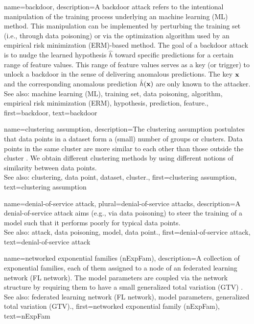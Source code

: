 {	
{name={backdoor}, 
	description={A backdoor attack refers 
		to the intentional manipulation of the training process underlying an machine learning (ML) method. This manipulation 
		can be implemented by perturbing the training set (i.e., through data poisoning) or via the 
		optimization algorithm used by an empirical risk minimization (ERM)-based method. The goal of a 
		backdoor attack is to nudge the learned hypothesis $\hat{h}$ 
		toward specific predictions for a certain range of feature values. This range of feature 
		values serves as a key (or trigger) to unlock a backdoor in the sense of 
		delivering anomalous predictions. The key ${\bf x}$ and the corresponding 
		anomalous prediction $\hat{h}({\bf x})$ are only known to the attacker.
				\\
		See also: machine learning (ML), training set, data poisoning, algorithm, empirical risk minimization (ERM), hypothesis, prediction, feature.},
	first={backdoor},
	text={backdoor} 
}


{name={clustering assumption}, 
	description={The 
		clustering assumption postulates that data points in a dataset form a (small) number of 
		groups or clusters. Data points in the same cluster are more similar to each 
		other than those outside the cluster \cite{SemiSupervisedBook}. We obtain different 
		clustering methods by using different notions of similarity between data points.
				\\
		See also: clustering, data point, dataset, cluster.},
	first={clustering assumption},
	text={clustering assumption} 
}
	
{name={denial-of-service attack}, plural={denial-of-service attacks},
	description={A 
		denial-of-service attack aims (e.g., via data poisoning) to steer the training of a model 
		such that it performs poorly for typical data points.
				\\
		See also: attack, data poisoning, model, data point.},
	first={denial-of-service attack},
	text={denial-of-service attack} 
}

{name={networked exponential families (nExpFam)}, 
	description={A collection of exponential 
		families, each of them assigned to a node of an federated learning network (FL network). The model parameters are coupled 
	   	via the network structure by requiring them to have a small generalized total variation (GTV) \cite{JungNetExp2020}.
	   		\\
		See also: federated learning network (FL network), model parameters, generalized total variation (GTV).},
	first={networked exponential family (nExpFam)},
	text={nExpFam} 
}
	 

}
